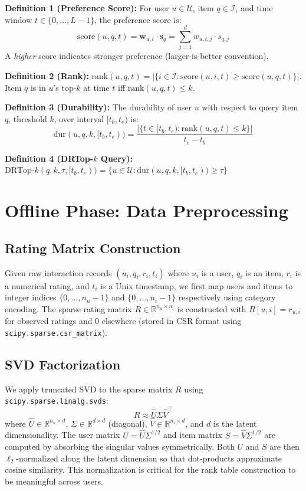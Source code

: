 \noindent\textbf{Definition 1 (Preference Score):}
For user $u \in \mathcal{U}$, item $q \in \mathcal{I}$, and time window $t \in \{0, \ldots, L-1\}$, the preference score is:
\[
  \text{score}(u, q, t) = \mathbf{w}_{u,t} \cdot \mathbf{s}_q = \sum_{j=1}^{d} w_{u,t,j} \cdot s_{q,j}
\]
A \emph{higher} score indicates stronger preference (larger-is-better convention).

\medskip
\noindent\textbf{Definition 2 (Rank):}
$\text{rank}(u, q, t) = |\{i \in \mathcal{I} : \text{score}(u, i, t) \geq \text{score}(u, q, t)\}|$. Item $q$ is in $u$'s top-$k$ at time $t$ iff $\text{rank}(u, q, t) \leq k$.

\medskip
\noindent\textbf{Definition 3 (Durability):}
The durability of user $u$ with respect to query item $q$, threshold $k$, over interval $[t_b, t_e)$ is:
\[
  \text{dur}(u, q, k, [t_b, t_e)) = \frac{|\{t \in [t_b, t_e) : \text{rank}(u, q, t) \leq k\}|}{t_e - t_b}
\]

\medskip
\noindent\textbf{Definition 4 (DRTop-$k$ Query):}
$\text{DRTop-}k(q, k, \tau, [t_b, t_e)) = \{u \in \mathcal{U} : \text{dur}(u, q, k, [t_b, t_e)) \geq \tau\}$

\section{Offline Phase: Data Preprocessing}

\subsection{Rating Matrix Construction}

Given raw interaction records $(u_i, q_i, r_i, t_i)$ where $u_i$ is a user, $q_i$ is an item, $r_i$ is a numerical rating, and $t_i$ is a Unix timestamp, we first map users and items to integer indices $\{0, \ldots, n_u - 1\}$ and $\{0, \ldots, n_i - 1\}$ respectively using category encoding. The sparse rating matrix $R \in \mathbb{R}^{n_u \times n_i}$ is constructed with $R[u, i] = r_{u,i}$ for observed ratings and 0 elsewhere (stored in CSR format using \texttt{scipy.sparse.csr\_matrix}).

\subsection{SVD Factorization}

We apply truncated SVD to the sparse matrix $R$ using \texttt{scipy.sparse.linalg.svds}:
\[
  R \approx \hat{U} \Sigma \hat{V}^\top
\]
where $\hat{U} \in \mathbb{R}^{n_u \times d}$, $\Sigma \in \mathbb{R}^{d \times d}$ (diagonal), $\hat{V} \in \mathbb{R}^{n_i \times d}$, and $d$ is the latent dimensionality. The user matrix $U = \hat{U} \Sigma^{1/2}$ and item matrix $S = \hat{V} \Sigma^{1/2}$ are computed by absorbing the singular values symmetrically. Both $U$ and $S$ are then $\ell_2$-normalized along the latent dimension so that dot-products approximate cosine similarity. This normalization is critical for the rank table construction to be meaningful across users.


